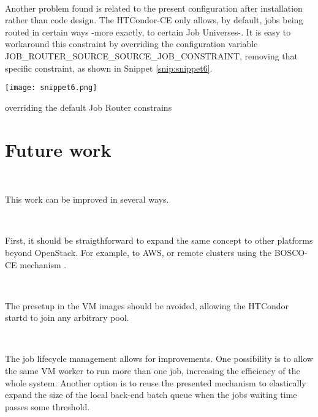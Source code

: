 \documentclass[a4paper]{jpconf}
\begin{document}
~

Another problem found is related to the present configuration after installation rather than code design. 
The HTCondor-CE only allows, by default, jobs being routed in certain ways -more exactly, to certain Job Universes-.
It is easy to workaround this constraint by overriding the configuration
variable JOB\_ROUTER\_SOURCE\_SOURCE\_JOB\_CONSTRAINT, 
removing that specific constraint, as shown in Snippet \ref{snip:snippet6}.

\begin{snippet}[h]
    \centering
    \renewcommand\figurename{Snippet}
    \texttt{[image: snippet6.png]}
    \caption{overriding the default Job Router constrains}
    \label{snip:snippet6}
\end{snippet}


\section{Future work}

~

This work can be improved in several ways. 

~

First, it should be straigthforward to expand the same concept to other
platforms beyond OpenStack. For example, to AWS, 
or remote clusters using the BOSCO-CE mechanism \cite{boscoce}.

~

The presetup in the VM images should be avoided, allowing the HTCondor startd to join any arbitrary pool.

~

The job lifecycle management allows for improvements. 
One possibility is to allow the same VM worker to run more than one job,
increasing the efficiency of the whole system. Another option is to reuse the
presented mechanism to elastically expand the size of the local back-end batch
queue when the jobs waiting time passes some threshold.
\end{document}
